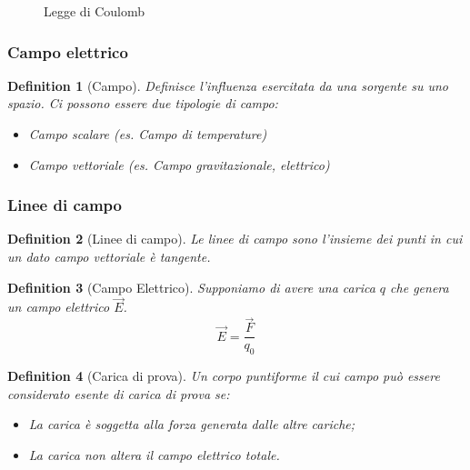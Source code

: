 \documentclass[12pt, a4paper]{article}
\newtheorem{definition}{Definition}[section]
\begin{document}
\begin{figure}[h]
    \centering
    \caption{Legge di Coulomb}
\end{figure}

\subsubsection{Campo elettrico}
\begin{definition}[Campo]
Definisce l'influenza esercitata da una sorgente su uno spazio. Ci possono essere due tipologie di campo:
\begin{itemize}
    \item Campo scalare (es. Campo di temperature)
    \item Campo vettoriale (es. Campo gravitazionale, elettrico)
\end{itemize}
\end{definition}

\subsubsection{Linee di campo}
\begin{definition}[Linee di campo]
Le linee di campo sono l'insieme dei punti in cui un dato campo vettoriale è tangente.
\end{definition}

\begin{definition}[Campo Elettrico]
Supponiamo di avere una carica $q$ che genera un campo elettrico $\vec{E}$.
\[
\vec{E} = \frac{\vec{F}}{q_0}
\]
\end{definition}

\begin{definition}[Carica di prova]
Un corpo puntiforme il cui campo può essere considerato esente di carica di prova se:
\begin{itemize}
    \item La carica è soggetta alla forza generata dalle altre cariche;
    \item La carica non altera il campo elettrico totale.
\end{itemize}
\end{definition}
\end{document}
